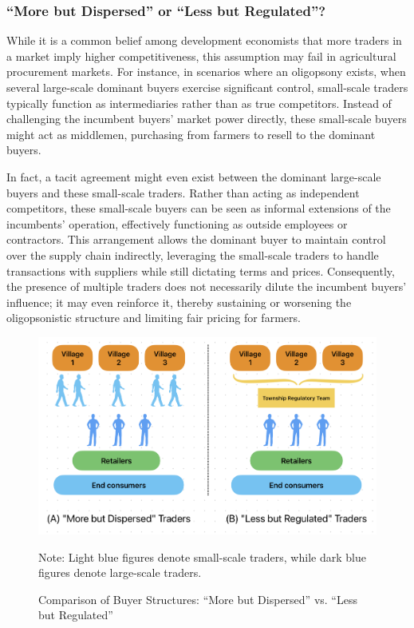 \subsubsection{``More but Dispersed'' or ``Less but Regulated''?}
\noindent While it is a common belief among development economists that more traders in a market imply higher competitiveness, this assumption may fail in agricultural procurement markets. For instance, in scenarios where an oligopsony exists, when several large-scale dominant buyers exercise significant control, small-scale traders typically function as intermediaries rather than as true competitors. Instead of challenging the incumbent buyers' market power directly, these small-scale buyers might act as middlemen, purchasing from farmers to resell to the dominant buyers. 

In fact, a tacit agreement might even exist between the dominant large-scale buyers and these small-scale traders. Rather than acting as independent competitors, these small-scale buyers can be seen as informal extensions of the incumbents' operation, effectively functioning as outside employees or contractors. This arrangement allows the dominant buyer to maintain control over the supply chain indirectly, leveraging the small-scale traders to handle transactions with suppliers while still dictating terms and prices. Consequently, the presence of multiple traders does not necessarily dilute the incumbent buyers' influence; it may even reinforce it, thereby sustaining or worsening the oligopsonistic structure and limiting fair pricing for farmers.

\begin{figure}[ht!]
    \centering
        \caption{Comparison of Buyer Structures: ``More but Dispersed'' vs. ``Less but Regulated''}
    \includegraphics[width=\linewidth]{figures/more_is_less.png}
    \label{fig: more is less}
    \begin{tablenotes}
    \footnotesize
    \item Note: Light blue figures denote small-scale traders, while dark blue figures denote large-scale traders. 
    \end{tablenotes}
\end{figure}

